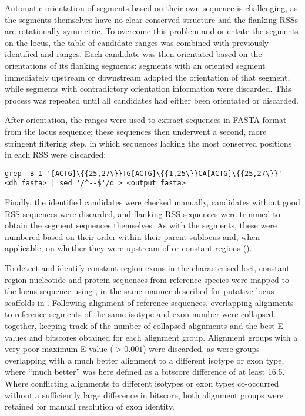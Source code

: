 Automatic orientation of \dh segments based on their own sequence is challenging, as the segments themselves have no clear conserved structure and the flanking RSSs are rotationally symmetric. To overcome this problem and orientate the \dh segments on the locus, the table of \dh candidate ranges was combined with previously-identified \vh and \jh ranges. Each \dh candidate was then orientated based on the orientations of its flanking segments: segments with an oriented segment immediately upstream or downstream adopted the orientation of that segment, while segments with contradictory orientation information were discarded. This process was repeated until all \dh candidates had either been orientated or discarded.

After orientation, the \dh ranges were used to extract \dh sequences in FASTA format from the locus sequence; these sequences then underwent a second, more stringent filtering step, in which sequences lacking the most conserved positions in each RSS \parencite{hesse1989rss} were discarded:

\begin{lstlisting}
grep -B 1 '[ACTG]\{{25,27\}}TG[ACTG]\{{1,25\}}CA[ACTG]\{{25,27\}}' <dh_fasta> | sed '/^--$'/d > <output_fasta>
\end{lstlisting}

\noindent Finally, the identified \dh candidates were checked manually, candidates without good RSS sequences were discarded, and flanking RSS sequences were trimmed to obtain the \dh segment sequences themselves. As with the \jh segments, these were numbered based on their order within their parent sublocus and, when applicable, on whether they were upstream of  or  constant regions ().


\noindent To detect and identify constant-region exons in the characterised loci, constant-region nucleotide and protein sequences from reference species were mapped to the locus sequence using  \parencite{altschul1990blast,altschul1997blast}, in the same manner described for putative locus scaffolds in .
Following alignment of reference sequences, overlapping alignments to reference segments of the same isotype and exon number were collapsed together, keeping track of the number of collapsed alignments and the best E-values and bitscores obtained for each alignment group. Alignment groups with a very poor maximum E-value ($> 0.001$) were discarded, as were groups overlapping with a much better alignment to a different isotype or exon type, where ``much better'' was here defined as a bitscore difference of at least 16.5. Where conflicting alignments to different isotypes or exon types co-occurred without a sufficiently large difference in bitscore, both alignment groups were retained for manual resolution of exon identity.

